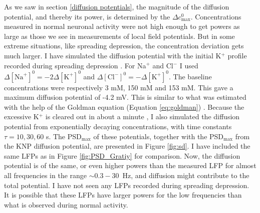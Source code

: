 \documentclass{uiophd}
\begin{document}
As we saw in section \ref{diffusion potentials}, the magnitude of the diffusion potential, and thereby its power, is determined by the $\Delta c_{\text{max}}^0$. Concentrations measured in normal neuronal activity were not high enough to get powers as large as those we see in measurements of local field potentials. But in some extreme situations, like spreading depression, the concentration deviation gets much larger. I have simulated the diffusion potential with the initial K$^+$ profile recorded during spreading depression \cite{Herreras1993}. For Na$^+$ and Cl$^-$ I used $\Delta [\text{Na}^+]^0 = -2\Delta [\text{K}^+]^0$ and $\Delta [\text{Cl}^-]^0 = -\Delta[\text{K}^+]^0$. The baseline concentrations were respectively 3 mM, 150 mM and 153 mM. This gave a maximum diffusion potential of -4.2 mV. This is similar to what was estimated with the help of the Goldman equation (Equation \ref{eq:goldman}) \cite{Herreras1993}. Because the excessive K$^+$ is cleared out in about a minute \cite{Ataya2015}, I also simulated the diffusion potential from exponentially decaying concentrations, with time constants $\tau = 10, 30, 60 $ s. The PSD$_{\text{max}}$ of these potentials, together with the PSD$_{\text{max}}$ from the KNP diffusion potential, are presented in Figure \ref{fig:sd}. I have included the same LFPs as in Figure \ref{fig:PSD_Gratiy} for comparison. 
Now, the diffusion potential is of the same, or even higher powers than the measured  LFP for almost all frequencies in the range $\sim 0.3 - 30$~Hz, and diffusion might contribute to the total potential. I have not seen any LFPs recorded during spreading depression. It is possible that these LFPs have larger powers for the low frequencies than what is observed during normal activity. 
\end{document}
